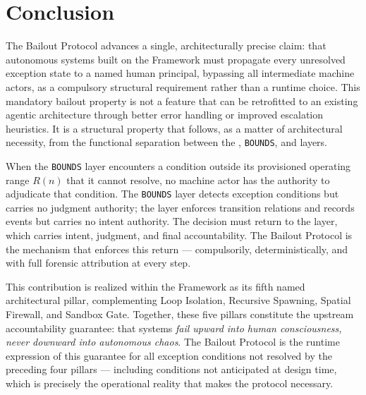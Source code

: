 \section{Conclusion}
\label{sec:conclusion}

The Bailout Protocol advances a single, architecturally precise claim: that autonomous systems built on the \bxthree{} Framework must propagate every unresolved exception state to a named human principal, bypassing all intermediate machine actors, as a compulsory structural requirement rather than a runtime choice. This mandatory bailout property is not a feature that can be retrofitted to an existing agentic architecture through better error handling or improved escalation heuristics. It is a structural property that follows, as a matter of architectural necessity, from the functional separation between the \purpose{}, \texttt{BOUNDS}{}, and \fact{} layers.

When the \texttt{BOUNDS}{} layer encounters a condition outside its provisioned operating range $R(n)$ that it cannot resolve, no machine actor has the authority to adjudicate that condition. The \texttt{BOUNDS}{} layer detects exception conditions but carries no judgment authority; the \fact{} layer enforces transition relations and records events but carries no intent authority. The decision must return to the \purpose{} layer, which carries intent, judgment, and final accountability. The Bailout Protocol is the mechanism that enforces this return --- compulsorily, deterministically, and with full forensic attribution at every step.

This contribution is realized within the \bxthree{} Framework as its fifth named architectural pillar, complementing Loop Isolation, Recursive Spawning, Spatial Firewall, and Sandbox Gate. Together, these five pillars constitute the upstream accountability guarantee: that \bxthree{} systems \emph{fail upward into human consciousness, never downward into autonomous chaos}. The Bailout Protocol is the runtime expression of this guarantee for all exception conditions not resolved by the preceding four pillars --- including conditions not anticipated at design time, which is precisely the operational reality that makes the protocol necessary.

